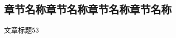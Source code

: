 \documentclass[color=BLUE]{textbook-cn}%
\begin{document}
\begin{Appendix}
\Remark{\lipsum[2]}

\clearpage




\printindex[video]

\chapter*{章节名称章节名称章节名称章节名称}
\lipsum
\lipsum




\newcommand{\wx}{\underline{~~\small\thewxcounter\refstepcounter{wxcounter}~~}}

\begin{Reading}{文章标题}{5}{3}
\lipsum[2]
\end{Reading}




\end{Appendix}
\end{document}
